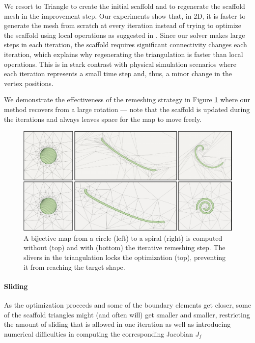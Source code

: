 We resort to Triangle \cite{Shewchuk:1996} to create the initial scaffold and to regenerate the scaffold mesh in the improvement step. Our experiments show that, in 2D, it is faster to generate the mesh from scratch at every iteration instead of trying to optimize the scaffold using local operations as suggested in \cite{Muller:2015}. Since our solver makes large steps in each iteration, the scaffold requires significant connectivity changes each iteration, which explains why regenerating the triangulation is faster than local operations. This is in stark contrast with physical simulation scenarios where each iteration represents a small time step and, thus, a minor change in the vertex positions.

We demonstrate the effectiveness of the remeshing strategy in Figure \ref{scaf:fig:recovering} where our method recovers from a large rotation --- note that the scaffold is updated during the iterations and always leaves space for the map to move freely.

\begin{figure}[h]
\includegraphics[width=\columnwidth]{scaf-tex/figs/coil-remeshing}
\caption{
\label{scaf:fig:recovering}
A bijective map from a circle (left) to a spiral (right) is computed without (top) and with (bottom) the iterative remeshing step. The slivers in the triangulation locks the optimization (top), preventing it from reaching the target shape.
}
\end{figure}
\paragraph{Sliding }
As the optimization proceeds and some of the boundary elements get closer, some of the scaffold triangles might (and often will) get smaller and smaller, restricting the amount of sliding that is allowed in one iteration as well as introducing numerical difficulties in computing the corresponding Jacobian $J_f$ 

